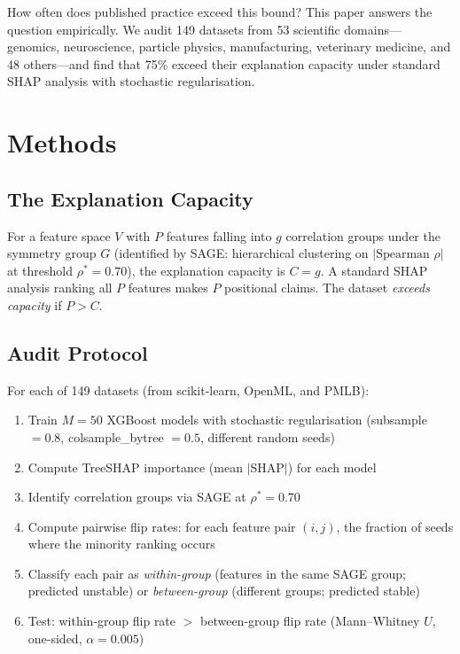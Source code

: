 \documentclass[11pt]{article}
\begin{document}
How often does published practice exceed this bound?  This paper answers
the question empirically.  We audit 149 datasets from 53 scientific
domains---genomics, neuroscience, particle physics, manufacturing,
veterinary medicine, and 48 others---and find that 75\% exceed their
explanation capacity under standard SHAP analysis with stochastic
regularisation.

\section{Methods}

\subsection{The Explanation Capacity}

For a feature space $V$ with $P$ features falling into $g$ correlation
groups under the symmetry group $G$ (identified by SAGE: hierarchical
clustering on $|\text{Spearman } \rho|$ at threshold $\rho^* = 0.70$),
the explanation capacity is $C = g$.  A standard SHAP analysis ranking all
$P$ features makes $P$ positional claims.  The dataset \emph{exceeds
capacity} if $P > C$.

\subsection{Audit Protocol}

For each of 149 datasets (from scikit-learn, OpenML, and PMLB):
\begin{enumerate}
  \item Train $M = 50$ XGBoost models with stochastic regularisation
    (subsample $= 0.8$, colsample\_bytree $= 0.5$, different random seeds)
  \item Compute TreeSHAP importance (mean $|\text{SHAP}|$) for each model
  \item Identify correlation groups via SAGE at $\rho^* = 0.70$
  \item Compute pairwise flip rates: for each feature pair $(i, j)$, the
    fraction of seeds where the minority ranking occurs
  \item Classify each pair as \emph{within-group} (features in the same
    SAGE group; predicted unstable) or \emph{between-group} (different
    groups; predicted stable)
  \item Test: within-group flip rate $>$ between-group flip rate
    (Mann--Whitney $U$, one-sided, $\alpha = 0.005$)
\end{enumerate}
\end{document}
